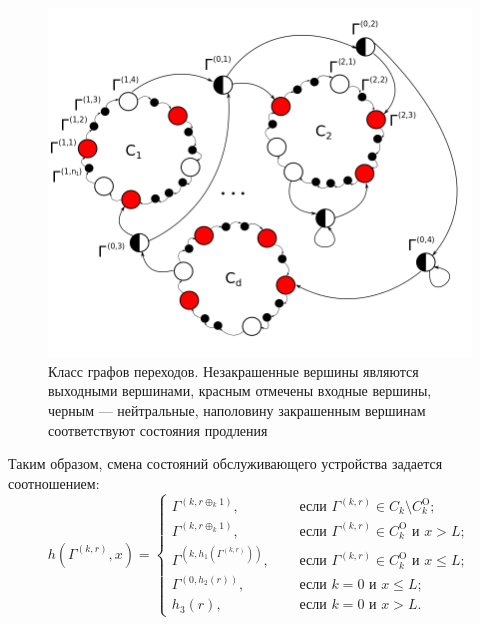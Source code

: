 \documentclass[a4paper,12pt,russian]{extarticle}
\newcommand{\ga}[1]{\Gamma^{\left( #1 \right)} }
\begin{document}
\begin{figure}[hb]\centering
\includegraphics[scale=0.5]{GraphScheme3.png} 
\caption{Класс графов переходов. Незакрашенные вершины являются выходными вершинами, красным отмечены входные вершины, черным --- нейтральные, наполовину закрашенным вершинам соответствуют состояния продления}
\label{GraphScheme}
\end{figure}

Таким образом, смена состояний обслуживающего устройства задается соотношением:
\begin{equation}
h(\ga{k,r},x) = 
\begin{cases}
\ga{k,r\oplus_k 1},& \quad \text{ если } \ga{k,r}\in C_k\setminus C_k^{\mathrm{O}};\\
\ga{k,r\oplus_k 1},& \quad \text{ если } \ga{k,r}\in C_k^{\mathrm{O}} \text{ и } x>L;\\
\ga{k,h_1(\ga{k,r})},& \quad \text{ если } \ga{k,r}\in C_k^{\mathrm{O}} \text{ и } x\leqslant L;\\
\ga{0,h_2(r)},& \quad \text{ если } k=0 \text{ и } x\leqslant L;\\
h_3(r),& \quad \text{ если } k=0 \text{ и } x > L.
\end{cases}
\label{hLaw}
\end{equation}
\end{document}
